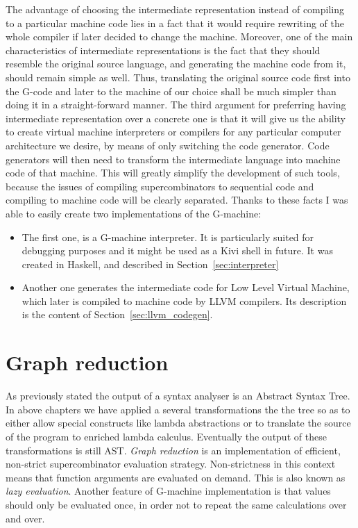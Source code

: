\documentclass[12pt,a4paper]{report}
\begin{document}
The advantage of choosing the intermediate representation instead of compiling
to a particular machine code lies in a fact that it would require rewriting of
the whole compiler if later decided to change the machine. Moreover, one of the
main characteristics of intermediate representations is the fact that they
should resemble the original source language, and generating the machine code
from it, should remain simple as well. Thus, translating the original source
code first into the G-code and later to the machine of our choice shall be much
simpler than doing it in a straight-forward manner. The third argument for
preferring having intermediate representation over a concrete one is that it
will give us the ability to create virtual machine interpreters or compilers
for any particular computer architecture we desire, by means of only switching
the code generator. Code generators will then need to transform the
intermediate language into machine code of that machine. This will greatly
simplify the development of such tools, because the issues of compiling
supercombinators to sequential code and compiling to machine code will be
clearly separated.  Thanks to these facts I was able to easily create two
implementations of the G-machine:

\begin{itemize}
  \item The first one, is a G-machine interpreter. It is particularly suited
    for debugging purposes and it might be used as a Kivi shell in future. It
    was created in Haskell, and described in Section~\ref{sec:interpreter}
  \item Another one generates the intermediate code for Low Level Virtual
    Machine, which later is compiled to machine code by LLVM compilers. Its
    description is the content of Section~\ref{sec:llvm_codegen}.
\end{itemize}

\section{Graph reduction}
\label{sec:graph_reduction}
As previously stated the output of a syntax analyser is an Abstract Syntax
Tree. In above chapters we have applied a several transformations the the tree
so as to either allow special constructs like lambda abstractions or to
translate the source of the program to enriched lambda calculus. Eventually the
output of these transformations is still AST. \textit{Graph reduction} is an
implementation of efficient, non-strict supercombinator evaluation strategy.
Non-strictness in this context means that function arguments are evaluated on
demand. This is also known as \textit{lazy evaluation}. Another feature of
G-machine implementation is that values should only be evaluated once, in order
not to repeat the same calculations over and over.
\end{document}
